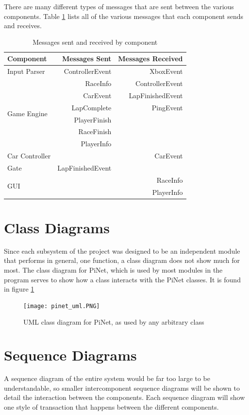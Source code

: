 \documentclass[letterpaper,fleqn]{article}
\begin{document}
There are many different types of messages that are sent between the various components. Table \ref{tab:msgs} lists all of the various messages that each component sends and receives.
\begin{table}[H]
\centering
\caption{Messages sent and received by component}
\begin{tabular}{|l|r|r|} \hline
	Component & Messages Sent & Messages Received \\ \hline\hline
    Input Parser & ControllerEvent & XboxEvent \\ \hline
    \multirow{6}{*}{Game Engine} & RaceInfo & ControllerEvent \\
    & CarEvent & LapFinishedEvent \\
    & LapComplete & PingEvent \\
    & PlayerFinish & \\
    & RaceFinish & \\
    & PlayerInfo & \\ \hline
    Car Controller & & CarEvent \\ \hline
    Gate & LapFinishedEvent & \\ \hline
    \multirow{2}{*}{GUI} & & RaceInfo \\
    & & PlayerInfo \\ \hline
\end{tabular}
\label{tab:msgs}
\end{table}

\section{Class Diagrams}
Since each subsystem of the project was designed to be an independent module that performs in general, one function, a class diagram does not show much for most.
The class diagram for PiNet, which is used by most modules in the program serves to show how a class interacts with the PiNet classes. It is found in figure \ref{fig:pinet_uml}

\begin{figure}[H]
\centering
\texttt{[image: pinet\_uml.PNG]}
\caption{UML class diagram for PiNet, as used by any arbitrary class}
\label{fig:pinet_uml}
\end{figure}

\section{Sequence Diagrams}
A sequence diagram of the entire system would be far too large to be understandable, so smaller intercomponent sequence diagrams will be shown to detail the interaction between the components. Each sequence diagram will show one style of transaction that happens between the different components.
\end{document}
